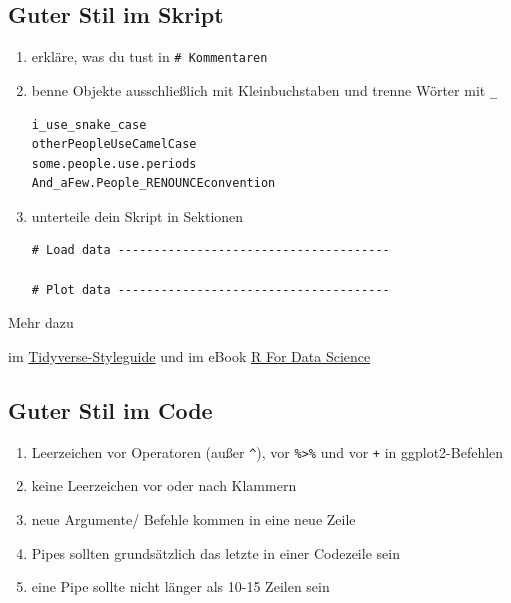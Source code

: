 \documentclass[
  custompaper,
  DIV=11,
  numbers=noendperiod]{scrartcl}
\begin{document}
\subsection{Guter Stil im Skript}\label{guter-stil-im-skript}

\begin{enumerate}
\def\labelenumi{\arabic{enumi}.}
\item
  erkläre, was du tust in \texttt{\#\ Kommentaren}
\item
  benne Objekte ausschließlich mit Kleinbuchstaben und trenne Wörter mit
  \texttt{\_}

\begin{verbatim}
i_use_snake_case 
otherPeopleUseCamelCase 
some.people.use.periods 
And_aFew.People_RENOUNCEconvention
\end{verbatim}
\item
  unterteile dein Skript in Sektionen

\begin{verbatim}
# Load data --------------------------------------

# Plot data --------------------------------------
\end{verbatim}
\end{enumerate}

\begin{tcolorbox}[enhanced jigsaw, coltitle=black, toprule=.15mm, breakable, colframe=quarto-callout-note-color-frame, leftrule=.75mm, arc=.35mm, opacitybacktitle=0.6, title=\textcolor{quarto-callout-note-color}{\faInfo}\hspace{0.5em}{Note}, rightrule=.15mm, colback=white, titlerule=0mm, bottomtitle=1mm, toptitle=1mm, bottomrule=.15mm, left=2mm, opacityback=0, colbacktitle=quarto-callout-note-color!10!white]

Mehr dazu

im \href{https://style.tidyverse.org/}{Tidyverse-Styleguide} und im
eBook \href{https://r4ds.hadley.nz/workflow-style.html}{R For Data
Science}

\end{tcolorbox}

\subsection{Guter Stil im Code}\label{guter-stil-im-code}

\begin{enumerate}
\def\labelenumi{\arabic{enumi}.}
\item
  Leerzeichen vor Operatoren (außer \texttt{\^{}}), vor
  \texttt{\%\textgreater{}\%} und vor \texttt{+} in ggplot2-Befehlen
\item
  keine Leerzeichen vor oder nach Klammern
\item
  neue Argumente/ Befehle kommen in eine neue Zeile
\item
  Pipes sollten grundsätzlich das letzte in einer Codezeile sein
\item
  eine Pipe sollte nicht länger als 10-15 Zeilen sein
\end{enumerate}
\end{document}
